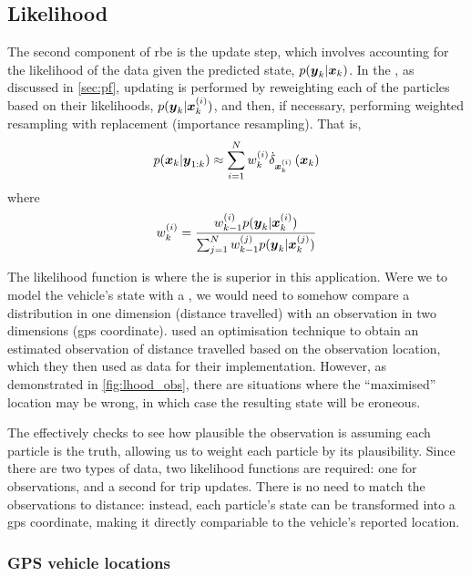 \subsection{Likelihood}
\label{sec:pf-likelihood}

The second component of \gls{rbe} is the update step, which involves accounting for the likelihood of the data given the predicted state, $p(\boldsymbol{y}_k | \boldsymbol x_k)$. In the \pf{}, as discussed in \cref{sec:pf}, updating is performed by reweighting each of the particles based on their likelihoods, $p(\boldsymbol{y}_k | \boldsymbol x^{(i)}_k)$, and then, if necessary, performing weighted resampling with replacement (importance resampling). That is,
\begin{equation}
\label{eq:vehicle_pf_update}
p(\Vstate_k | \Vobs_{1:k}) \approx
\sum_{i=1}^\Np
    \Pwt_{k}
    \DiracMeasure{\Vstate\vi_k}{\Vstate_k}
\end{equation}
where
\begin{equation}
\label{eq:vehicle_pf_reweight}
\Pwt_k = \frac{
    \Pwt_{k-1} p(\Vobs_k | \Vstate\vi_k)
}{
    \sum_{j=1}^\Np \Pwt[j]_{k-1} p(\Vobs_k | \Vstate\vi[j]_k)
}
\end{equation}


The likelihood function is where the \pf{} is superior in this application. Were we to model the vehicle's state with a \kf{}, we would need to somehow compare a distribution in one dimension (distance travelled) with an observation in two dimensions (\gls{gps} coordinate). \citet{Cathey_2003} used an optimisation technique to obtain an estimated observation of distance travelled based on the observation location, which they then used as data for their \kf{} implementation. However, as demonstrated in \cref{fig:lhood_obs}, there are situations where the ``maximised'' location may be wrong, in which case the resulting state will be eroneous.


The \pf{} effectively checks to see how plausible the observation is assuming each particle is the truth, allowing us to weight each particle by its plausibility. Since there are two types of data, two likelihood functions are required: one for \GPS{} observations, and a second for trip updates. There is no need to match the observations to distance: instead, each particle's state can be transformed into a \gls{gps} coordinate, making it directly compariable to the vehicle's reported location.


\subsubsection{GPS vehicle locations}
\label{sec:lhood_gps}

